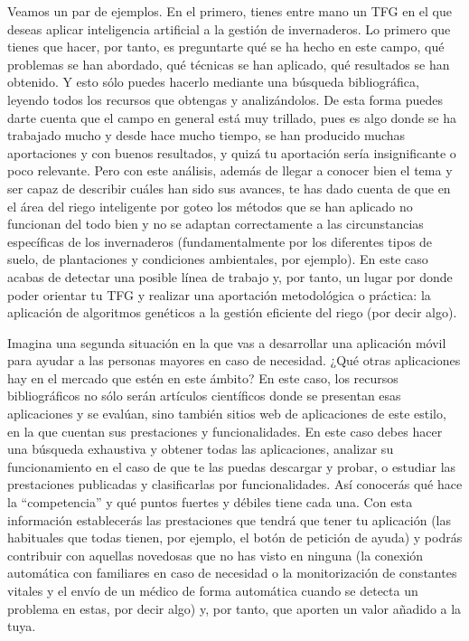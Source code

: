 Veamos un par de ejemplos. En el primero, tienes entre mano un TFG en el que deseas aplicar inteligencia artificial a la gestión de invernaderos. Lo primero que tienes que hacer, por tanto, es preguntarte qué se ha hecho en este campo, qué problemas se han abordado, qué técnicas se han aplicado, qué resultados se han obtenido. Y esto sólo puedes hacerlo mediante una búsqueda bibliográfica, leyendo todos los recursos que obtengas y analizándolos. De esta forma puedes darte cuenta que el campo en general está muy trillado, pues es algo donde se ha trabajado mucho y desde hace mucho tiempo, se han producido muchas aportaciones y con buenos resultados, y quizá tu aportación sería insignificante o poco relevante. Pero con este análisis, además de llegar a conocer bien el tema y ser capaz de describir cuáles han sido sus avances, te has dado cuenta de que en el área del riego inteligente por goteo los métodos que se han aplicado no funcionan del todo bien y no se adaptan correctamente a las circunstancias específicas de los invernaderos (fundamentalmente por los diferentes tipos de suelo, de plantaciones y condiciones ambientales, por ejemplo). En este caso acabas de detectar una posible línea de trabajo y, por tanto, un lugar por donde poder orientar tu TFG y realizar una aportación metodológica o práctica: la aplicación de algoritmos genéticos a la gestión eficiente del riego (por decir algo). 

Imagina una segunda situación en la que vas a desarrollar una aplicación móvil para ayudar a las personas mayores en caso de necesidad. ¿Qué otras aplicaciones hay en el mercado que estén en este ámbito? En este caso, los recursos bibliográficos no sólo serán artículos científicos donde se presentan esas aplicaciones y se evalúan, sino también  sitios web de aplicaciones de este estilo, en la que cuentan sus prestaciones y funcionalidades. En este caso debes hacer una búsqueda exhaustiva y obtener todas las aplicaciones, analizar su funcionamiento en el caso de que te las puedas descargar y probar, o estudiar las prestaciones publicadas y clasificarlas por funcionalidades. Así conocerás qué hace la ``competencia'' y qué puntos fuertes y débiles tiene cada una. Con esta información establecerás las prestaciones que tendrá que tener tu aplicación (las habituales que todas tienen, por ejemplo, el botón de petición de ayuda) y podrás contribuir con aquellas novedosas que no has visto en ninguna (la conexión automática con familiares en caso de necesidad o la monitorización de constantes vitales y el envío de un médico de forma automática cuando se detecta un problema en estas, por decir algo) y, por tanto, que aporten un valor añadido a la tuya.

